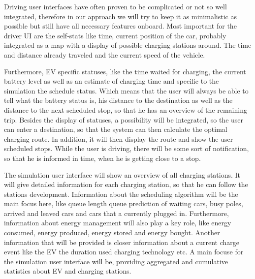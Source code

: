 \documentclass[hidelinks]{sig-alternate}
\begin{document}
Driving user interfaces have often proven to be complicated or not so well integrated, therefore in our approach we
will try to keep it as minimalistic as possible but still have all necessary features onboard. Most important for the
driver UI are the self-stats like time, current position of the car, probably integrated as a map with a display of
possible charging stations around. The time and distance already traveled and the current speed of the vehicle.

Furthermore, EV specific statuses, like the time waited for charging, the current battery level as well as an
estimate of charging time and specific to the simulation the schedule status. Which means that the user will always
be able to tell what the battery status is, his distance to the destination as well as the distance to the next
scheduled stop, so that he has an overview of the remaining trip. Besides the display of statuses, a possibility
will be integrated, so the user can enter a destination, so that the system can then calculate the optimal charging
route. In addition, it will then display the route and show the user scheduled stops. While the user is driving,
there will be some sort of notification, so that he is informed in time, when he is getting close to a stop.

The simulation user interface will show an overview of all charging stations. It will give detailed information for
each charging station, so that he can follow the stations development. Information about the scheduling algorithm
will be the main focus here, like queue length queue prediction of waiting cars, busy poles, arrived and leaved cars
and cars that a currently plugged in. Furthermore, information about energy management will also play a key role,
like energy consumed, energy produced, energy stored and energy bought. Another information that will be provided is
closer information about a current charge event like the EV the duration used charging technology etc. A main focuse
for the simulation user interface will be, providing aggregated and cumulative statistics about EV and charging
stations.



\end{document}
